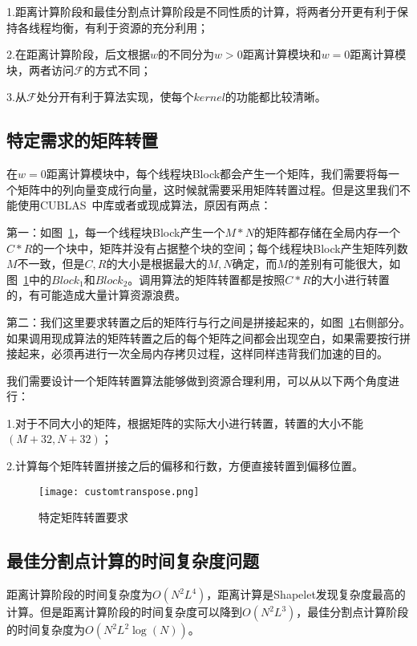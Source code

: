 1.距离计算阶段和最佳分割点计算阶段是不同性质的计算，将两者分开更有利于保持各线程均衡，有利于资源的充分利用；

2.在距离计算阶段，后文根据$w$的不同分为$w>0$距离计算模块和$w=0$距离计算模块，两者访问$\mathcal{F}$的方式不同；

3.从$\mathcal{F}$处分开有利于算法实现，使每个$kernel$的功能都比较清晰。


\subsection{特定需求的矩阵转置}

在$w=0$距离计算模块中，每个线程块Block都会产生一个矩阵，我们需要将每一个矩阵中的列向量变成行向量，这时候就需要采用矩阵转置过程。但是这里我们不能使用CUBLAS~\cite{chrzeszczyk2013matrix}中库或者或现成算法，原因有两点：

第一：如图~\ref{fig:customtranspose}，每一个线程块Block产生一个$M*N$的矩阵都存储在全局内存一个$C*R$的一个块中，矩阵并没有占据整个块的空间；每个线程块Block产生矩阵列数$M$不一致，但是$C,R$的大小是根据最大的$M,N$确定，而$M$的差别有可能很大，如图~\ref{fig:customtranspose}中的$Block_1$和$Block_2$。调用算法的矩阵转置都是按照$C*R$的大小进行转置的，有可能造成大量计算资源浪费。

第二：我们这里要求转置之后的矩阵行与行之间是拼接起来的，如图~\ref{fig:customtranspose}右侧部分。如果调用现成算法的矩阵转置之后的每个矩阵之间都会出现空白，如果需要按行拼接起来，必须再进行一次全局内存拷贝过程，这样同样违背我们加速的目的。

我们需要设计一个矩阵转置算法能够做到资源合理利用，可以从以下两个角度进行：

1.对于不同大小的矩阵，根据矩阵的实际大小进行转置，转置的大小不能$(M+32,N+32)$；

2.计算每个矩阵转置拼接之后的偏移和行数，方便直接转置到偏移位置。
\begin{figure}[H] %
	\centering
	\texttt{[image: customtranspose.png]}
	\caption{特定矩阵转置要求}
	\label{fig:customtranspose}
\end{figure}
\subsection{最佳分割点计算的时间复杂度问题}

距离计算阶段的时间复杂度为$O(N^2L^4)$，距离计算是Shapelet发现复杂度最高的计算。但是距离计算阶段的时间复杂度可以降到$O(N^2L^3)$，最佳分割点计算阶段的时间复杂度为$O(N^2L^2\log(N))$。

